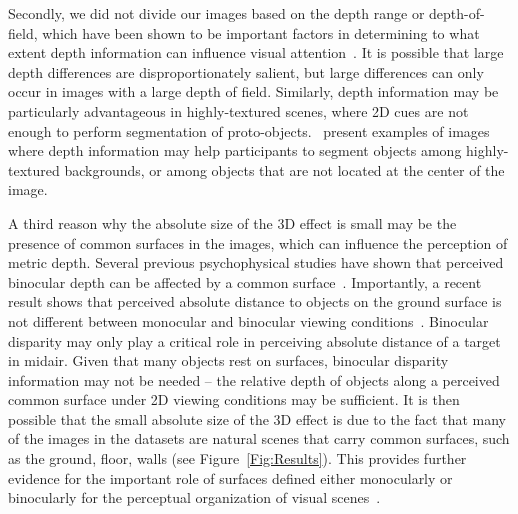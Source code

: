 Secondly, we did not divide our images based on the depth range or depth-of-field, which have been shown to be important factors in determining to what extent depth information can influence visual attention~\citep{Lang_etal12}. It is possible that large depth differences are disproportionately salient, but large differences can only occur in images with a large depth of field. Similarly, depth information may be particularly advantageous in highly-textured scenes, where 2D cues are not enough to perform segmentation of proto-objects.~\cite{Ma_Hang15} present examples of images where depth information may help participants to segment objects among highly-textured backgrounds, or among objects that are not located at the center of the image.

A third reason why the absolute size of the 3D effect is small may be the presence of common surfaces in the images, which can influence the
perception of metric depth. Several previous psychophysical studies have shown that perceived binocular depth can be affected by a common
surface~\citep{McKee_83,Glennerster_McKee99,He_Ooi00}. Importantly, a recent result shows that perceived absolute distance to objects on the
ground surface is not different between monocular and binocular viewing conditions~\citep{Ooi_He15}. Binocular disparity may only play a critical role in perceiving absolute distance of a target in midair. Given that many objects rest on surfaces, binocular disparity information may not be needed -- the relative depth of objects along a perceived common surface under 2D viewing conditions may be sufficient. It is then possible that the small absolute size of the 3D effect is due to the fact that many of the images in the datasets are natural scenes that carry common surfaces, such as the ground, floor, walls \etc (see Figure~\ref{Fig:Results}). This provides further evidence for the important role of surfaces defined either monocularly or binocularly for the perceptual organization of visual scenes~\citep{He_Nakayama92,He_Nakayama95,Hu_etal15a}.

